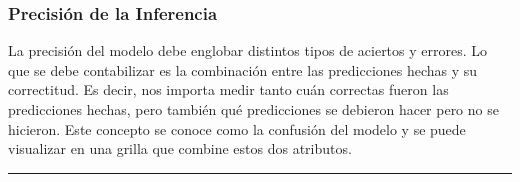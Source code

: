 \documentclass[a4paper]{article}
\begin{document}
\subsubsection{Precisión de la Inferencia}

La precisión del modelo debe englobar distintos tipos de aciertos y errores. Lo que se debe contabilizar es la combinación entre las predicciones hechas y su correctitud. Es decir, nos importa medir tanto cuán correctas fueron las predicciones hechas, pero también qué predicciones se debieron hacer pero no se hicieron. Este concepto se conoce como la confusión del modelo y se puede visualizar en una grilla que combine estos dos atributos.

\begin{figure}[H]
\end{figure}

\hrule
\end{document}
